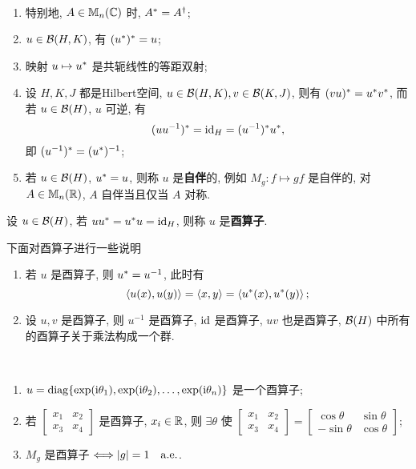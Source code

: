	\begin{Remark}~
		\begin{enumerate}[(1)]
			\item 特别地, $ A\in\mathbb{M}_{n}(\mathbb{C}) $ 时, $ A^{*}=A^{\dagger} $;
			\item $ u\in\mathcal{B}(H, K) $, 有 $ (u^{*})^{*}=u $;
			\item 映射 $ u\mapsto u^{*} $ 是共轭线性的等距双射;
			\item 设 $ H, K, J $ 都是Hilbert空间, $ u\in\mathcal{B}(H, K), v\in\mathcal{B}(K, J) $, 则有 $ (vu)^{*}=u^{*}v^{*} $, 而若 $ u\in\mathcal{B}(H) $, $ u $ 可逆, 有
			\[
				(uu^{-1})^{*}=\mathrm{id}_{H}=(u^{-1})^{*}u^{*},
			\]
			即 $ (u^{-1})^{*}=(u^{*})^{-1} $;
			\item 若 $ u\in\mathcal{B}(H) $, $ u^{*}=u $, 则称 $ u $ 是\textbf{自伴}的, 例如 $ M_{g}: f\mapsto gf $ 是自伴的, 对 $ A\in\mathbb{M}_{n}(\mathbb{R}) $, $ A $ 自伴当且仅当 $ A $ 对称.
		\end{enumerate}
	\end{Remark}
	\begin{Definition}[酉算子]\label{def:酉算子}
			 设 $ u\in \mathcal{B}(H) $, 若 $ uu^{*}=u^{*}u=\mathrm{id}_{H} $, 则称 $ u $ 是\textbf{酉算子}.
	\end{Definition}
	\begin{Remark}
		下面对酉算子进行一些说明
		\begin{enumerate}[(1)]
			\item 若 $ u $ 是酉算子, 则 $ u^{*}=u^{-1} $, 此时有
			\[
				\left\langle u(x), u(y) \right\rangle=\left\langle x, y \right\rangle=\left\langle u^{*}(x), u^{*}(y) \right\rangle;
			\]
			\item 设 $ u, v $ 是酉算子, 则 $ u^{-1} $ 是酉算子, $ \mathrm{id} $ 是酉算子, $ uv $ 也是酉算子, $ \mathcal{B}(H) $ 中所有的酉算子关于乘法构成一个群.
		\end{enumerate}
	\end{Remark}

	\begin{Example}~
		\begin{enumerate}[(1)]
			\item $ u=\mathrm{diag}\{ \exp(\mathrm{i} \theta_{1}), \exp(\mathrm{i}\theta_{2}), \dots, \exp(\mathrm{i}\theta_{n}) \} $ 是一个酉算子;
			\item 若
		$ \left[\begin{smallmatrix}
		x_{1} & x_{2}\\
		x_{3} & x_{4}	
		\end{smallmatrix}\right] $ 是酉算子, $ x_{i}\in\mathbb{R} $, 则 $ \exists\theta $ 使 
		$ \left[\begin{smallmatrix}
			x_{1} & x_{2}\\
			x_{3} & x_{4}
		\end{smallmatrix}\right]=\left[\begin{smallmatrix}
			\cos\theta & \sin\theta \\
			-\sin\theta & \cos\theta
		\end{smallmatrix}\right] $;
		\item $ M_{g} $ 是酉算子 $ \Longleftrightarrow\left| g \right| =1\quad \mathrm{a.e.} $.
		\end{enumerate}
	\end{Example}

